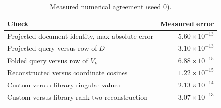 \par
\begin{table}[htbp]\centering
\small
\caption{Measured numerical agreement (seed 0).}
\begin{tabular}{lr}\toprule
Check & Measured error \\ \midrule
Projected document identity, max absolute error & $5.60\times10^{-13}$ \\
Projected query versus row of $D$ & $3.10\times10^{-13}$ \\
Folded query versus row of $V_k$ & $6.88\times10^{-15}$ \\
Reconstructed versus coordinate cosines & $1.22\times10^{-15}$ \\
Custom versus library singular values & $2.13\times10^{-14}$ \\
Custom versus library rank-two reconstruction & $3.07\times10^{-13}$ \\
\bottomrule\end{tabular}
\end{table}
\par
